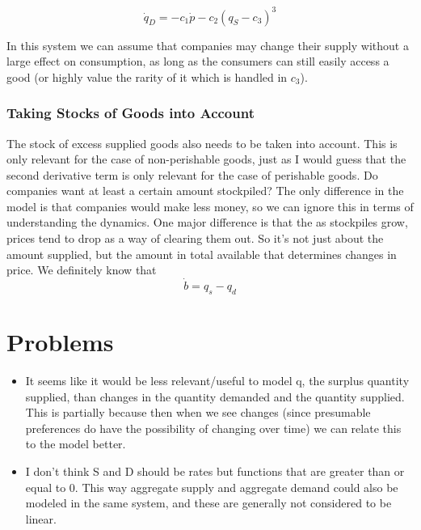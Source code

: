 \documentclass{article}
\begin{document}
\begin{equation}
		\dot{q}_D = - c_1 \dot{p} - c_2(q_S-c_3)^3
\end{equation}

In this system we can assume that companies may change their supply without a large effect on consumption, as long as the consumers can still easily access a good (or highly value the rarity of it which is handled in $c_3$).

\subsubsection{Taking Stocks of Goods into Account}
The stock of excess supplied goods also needs to be taken into account. This is only relevant for the case of non-perishable goods, just as I would guess that the second derivative term is only relevant for the case of perishable goods. Do companies want at least a certain amount stockpiled? The only difference in the model is that companies would make less money, so we can ignore this in terms of understanding the dynamics. One major difference is that the as stockpiles grow, prices tend to drop as a way of clearing them out. So it's not just about the amount supplied, but the amount in total available that determines changes in price. We definitely know that 
\begin{equation*}
	\dot{b} = q_s - q_d
\end{equation*}



\section{Problems}
\begin{itemize}
	\item It seems like it would be less relevant/useful to model q, the surplus quantity supplied, than changes in the quantity demanded and the quantity supplied. This is partially because then when we see changes (since presumable preferences do have the possibility of changing over time) we can relate this to the model better.
	\item I don't think S and D should be rates but functions that are greater than or equal to 0. This way aggregate supply and aggregate demand could also be modeled in the same system, and these are generally not considered to be linear.
\end{itemize}
\end{document}
